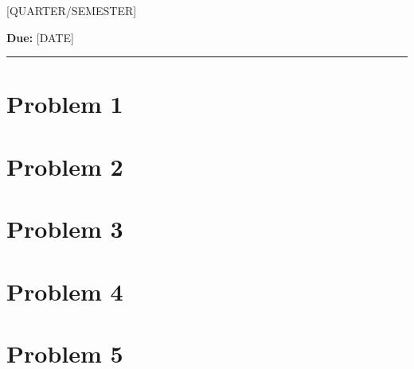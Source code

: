 \documentclass[11pt]{article}
\theoremstyle{plain}
\theoremstyle{definition}
\theoremstyle{remark}
\begin{document}

\noindent {\large {\bf [NAME]}\hfill 
{\bf [COURSE]}}

 \hfill 
{[QUARTER/SEMESTER]} 

\noindent {[ASSIGNMENT]} \hfill 
{{\bf Due:} [DATE]} 

\noindent \rule[0.1in]{\textwidth}{0.4pt}


\section*{Problem 1}

\section*{Problem 2}

\section*{Problem 3}

\section*{Problem 4}

\section*{Problem 5}
\end{document}
